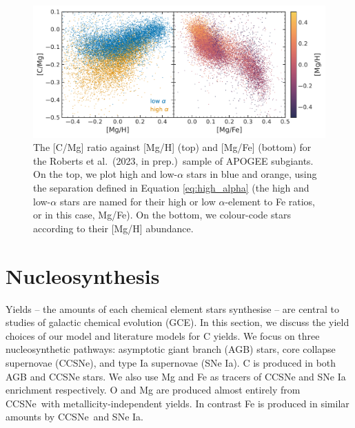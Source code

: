 \documentclass[fleqn,usenatbib]{mnras}
\newcommand{\citetjack}{Roberts et al.~(2023, in prep.)}
\newcommand{\agb}{AGB}
\newcommand{\apogee}{APOGEE}
\newcommand{\cc}{CCSNe}
\newcommand{\ia}{SNe Ia}
\begin{document}


\begin{figure}
    \centering
    \includegraphics{subgiants.pdf}
    \caption{The [C/Mg] ratio against [Mg/H] (top) and [Mg/Fe] (bottom) for the \citetjack~sample of \apogee{} subgiants. On the top, we plot high and low-$\alpha$ stars in blue and orange, using the separation defined in Equation \ref{eq:high_alpha} (the high and low-$\alpha$ stars are named for their high or low $\alpha$-element to Fe ratios, or in this case, Mg/Fe). On the bottom, we colour-code stars according to their [Mg/H] abundance.} \label{fig:subgiants}
\end{figure}








\section{Nucleosynthesis}

Yields -- the amounts of each chemical element stars synthesise -- are central to studies of galactic chemical evolution (GCE). 
In this section, we discuss the yield choices of our model and literature models for C yields. 
We focus on three nucleosynthetic pathways: asymptotic giant branch (\agb{}) stars, core collapse supernovae (\cc{}), and type Ia supernovae (\ia{}).
C is produced in both \agb{} and \cc{} stars.
We also use Mg and Fe as tracers of \cc{} and \ia{} enrichment respectively. 
O and Mg are produced almost entirely from \cc\ with metallicity-independent yields. In contrast Fe is produced in similar amounts by \cc\ and \ia.
\end{document}
